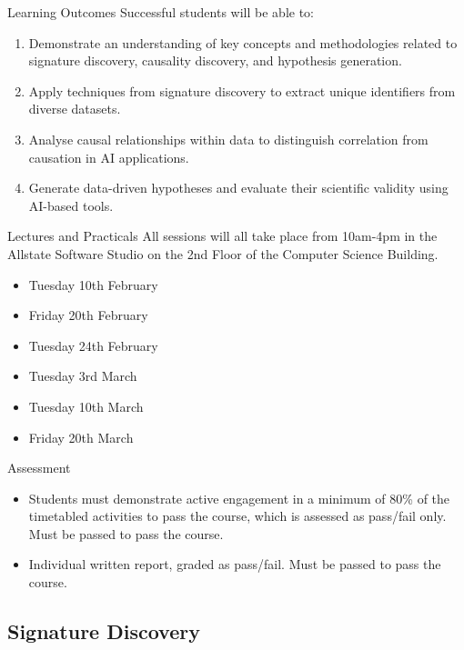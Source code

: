 \documentclass[aspectratio=169]{beamer}
\begin{document}
\begin{frame}{Learning Outcomes}
  Successful students will be able to:
  \begin{enumerate}
    \item Demonstrate an understanding of key concepts and methodologies related to signature discovery, causality discovery, and hypothesis generation.
    \item Apply techniques from signature discovery to extract unique identifiers from diverse datasets.
    \item Analyse causal relationships within data to distinguish correlation from causation in AI applications.
    \item Generate data-driven hypotheses and evaluate their scientific validity using AI-based tools.
  \end{enumerate}
\end{frame}

\begin{frame}{Lectures and Practicals}
  All sessions will all take place from 10am-4pm in the Allstate Software Studio on the 2nd Floor of the Computer Science Building.
  \begin{itemize}
    \item Tuesday 10th February
    \item Friday 20th February
    \item Tuesday 24th February
    \item Tuesday 3rd March
    \item Tuesday 10th March
    \item Friday 20th March
  \end{itemize}
\end{frame}

\begin{frame}{Assessment}
  \begin{itemize}
    \item Students must demonstrate active engagement in a minimum of 80\% of the timetabled activities to pass the course, which is assessed as pass/fail only. Must be passed to pass the course.
    \item Individual written report, graded as pass/fail. Must be passed to pass the course.
  \end{itemize}
\end{frame}

\subsection{Signature Discovery}
\end{document}
